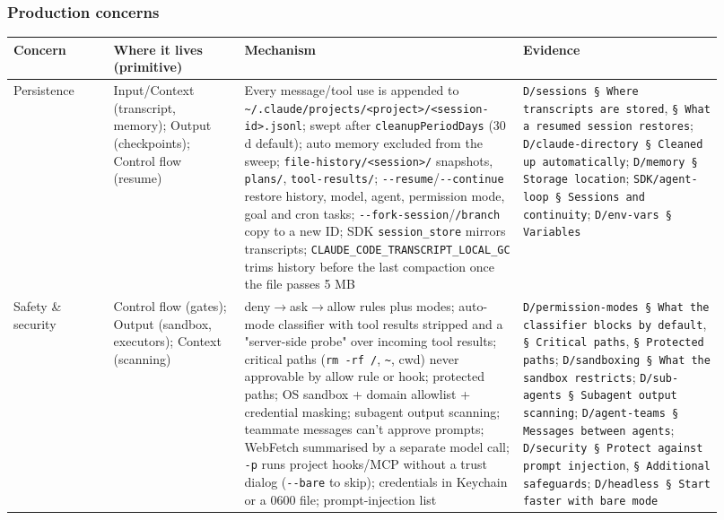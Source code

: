 \subsubsection*{Production concerns}
\begin{longtable}{@{}p{0.13\linewidth}p{0.17\linewidth}p{0.36\linewidth}p{0.26\linewidth}@{}}
\toprule \textbf{Concern} & \textbf{Where it lives (primitive)} & \textbf{Mechanism} & \textbf{Evidence} \\ \midrule \endhead
Persistence & Input/Context (transcript, memory); Output (checkpoints); Control flow (resume) & Every message/tool use is appended to \texttt{\textasciitilde{}/\allowbreak{}.\allowbreak{}claude/\allowbreak{}projects/\allowbreak{}<project>/\allowbreak{}<session-\allowbreak{}id>.\allowbreak{}jsonl}; swept after \texttt{cleanupPeriodDays} (30 d default); auto memory excluded from the sweep; \texttt{file-\allowbreak{}history/\allowbreak{}<session>/\allowbreak{}} snapshots, \texttt{plans/\allowbreak{}}, \texttt{tool-\allowbreak{}results/\allowbreak{}}; \texttt{-\allowbreak{}-\allowbreak{}resume}/\texttt{-\allowbreak{}-\allowbreak{}continue} restore history, model, agent, permission mode, goal and cron tasks; \texttt{-\allowbreak{}-\allowbreak{}fork-\allowbreak{}session}/\texttt{/\allowbreak{}branch} copy to a new ID; SDK \texttt{session\_\allowbreak{}store} mirrors transcripts; \texttt{CLAUDE\_\allowbreak{}CODE\_\allowbreak{}TRANSCRIPT\_\allowbreak{}LOCAL\_\allowbreak{}GC} trims history before the last compaction once the file passes 5 MB & \texttt{D/\allowbreak{}sessions § Where transcripts are stored}, \texttt{§ What a resumed session restores}; \texttt{D/\allowbreak{}claude-\allowbreak{}directory § Cleaned up automatically}; \texttt{D/\allowbreak{}memory § Storage location}; \texttt{SDK/\allowbreak{}agent-\allowbreak{}loop § Sessions and continuity}; \texttt{D/\allowbreak{}env-\allowbreak{}vars § Variables} \\
Safety \& security & Control flow (gates); Output (sandbox, executors); Context (scanning) & deny$\rightarrow$ask$\rightarrow$allow rules plus modes; auto-mode classifier with tool results stripped and a "server-side probe" over incoming tool results; critical paths (\texttt{rm -\allowbreak{}rf /\allowbreak{}}, \texttt{\textasciitilde{}}, cwd) never approvable by allow rule or hook; protected paths; OS sandbox + domain allowlist + credential masking; subagent output scanning; teammate messages can't approve prompts; WebFetch summarised by a separate model call; \texttt{-\allowbreak{}p} runs project hooks/MCP without a trust dialog (\texttt{-\allowbreak{}-\allowbreak{}bare} to skip); credentials in Keychain or a 0600 file; prompt-injection list & \texttt{D/\allowbreak{}permission-\allowbreak{}modes § What the classifier blocks by default}, \texttt{§ Critical paths}, \texttt{§ Protected paths}; \texttt{D/\allowbreak{}sandboxing § What the sandbox restricts}; \texttt{D/\allowbreak{}sub-\allowbreak{}agents § Subagent output scanning}; \texttt{D/\allowbreak{}agent-\allowbreak{}teams § Messages between agents}; \texttt{D/\allowbreak{}security § Protect against prompt injection}, \texttt{§ Additional safeguards}; \texttt{D/\allowbreak{}headless § Start faster with bare mode} \\

\end{longtable}
